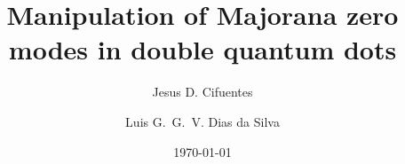 \documentclass[showpacs,aps,prb,reprint,superscriptaddress]{revtex4-1}
\begin{document}
\newcommand{\be}   {\begin{equation}}
\newcommand{\ee}   {\end{equation}}
\newcommand{\ba}   {\begin{eqnarray}}
\newcommand{\ea}   {\end{eqnarray}}
\newcommand{\ve}  {\varepsilon}

\newcommand{\nhat}{\hat{n}}
\newcommand{\veck}{\textbf{k}}
\newcommand\ep{\epsilon}
\newcommand\g{\gamma}
\newcommand\s{\sigma}
\newcommand\up{\uparrow}
\newcommand\dw{\downarrow}
\newcommand\down{\downarrow}
\newcommand{\ed}[1]{\ep_{d#1}}
\newcommand{\ket}[1]{\vert #1 \rangle}
\newcommand{\ann}{a^{\dagger}}
\newcommand{\dann}{d^{\dagger}}
\newcommand{\tdots}{t_{dots}}
\newcommand{\gammaA}[1]{\gamma_{A,#1}}
\newcommand{\gammaB}[1]{\gamma_{B,#1}}
\newcommand{\Green}[1]{G_{#1}(\omega) }

\newcommand{\GreenG}[2]{G_{#1}^{ #2} (\omega) }

\newcommand{\super}{\vert \Delta \vert}





\title{ Manipulation of Majorana zero modes in  double quantum dots }

\author{Jesus D. Cifuentes}
\author{Luis G.~G.~V. Dias da Silva}

\date{ \today }
\end{document}
